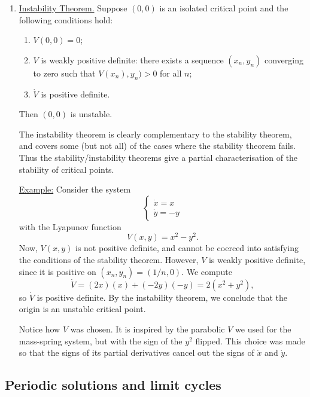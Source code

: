 \documentclass[11pt, letterpaper, oneside]{article}     %
\numberwithin{equation}{subsection}
\theoremstyle{definition}
\numberwithin{theorem}{section}
\theoremstyle{remark}
\begin{document}
\begin{enumerate}
  \medskip

\item \underline{Instability Theorem.} Suppose $(0,0)$ is an isolated critical point and the following conditions hold:
  \begin{enumerate}
  \item $V(0,0) = 0$;
  \item $V$ is weakly positive definite: there exists a sequence $(x_n,y_n)$ converging to zero such that $V(x_n),y_n) > 0$ for all $n$;
  \item $\dot V$ is positive definite.
  \end{enumerate}
  Then $(0,0)$ is unstable.

  The instability theorem is clearly complementary to the stability theorem, and covers some (but not all) of the cases where the stability theorem fails. Thus the stability/instability theorems give a partial characterisation of the stability of critical points.

  \underline{Example:} Consider the system
  \begin{equation}
    \begin{cases}
      \dot x = x\\
      \dot y = -y
    \end{cases}
  \end{equation}
  with the Lyapunov function
  \begin{equation}
    V(x,y) = x^2 - y^2.
  \end{equation}
  Now, $V(x,y)$ is not positive definite, and cannot be coerced into satisfying the conditions of the stability theorem. However, $V$ is weakly positive definite, since it is positive on $(x_n,y_n) = (1/n,0)$. We compute
  \begin{equation}
    \dot V = (2x)(x) + (-2y)(-y)
    = 2(x^2+y^2),
  \end{equation}
  so $\dot V$ is positive definite. By the instability theorem, we conclude that the origin is an unstable critical point.

  Notice how $V$ was chosen. It is inspired by the parabolic $V$ we used for the mass-spring system, but with the sign of the $y^2$ flipped. This choice was made so that the signs of its partial derivatives cancel out the signs of $\dot x$ and $\dot y$.

\end{enumerate}

\medskip

\subsection{Periodic solutions and limit cycles}
\end{document}
